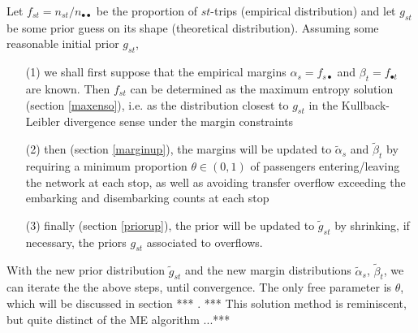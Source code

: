 \documentclass{bmcart}
\begin{document}
Let $f_{st}=n_{st}/n_{\bullet\bullet}$ be the proportion of $st$-trips (empirical distribution) and let $g_{st}$ be some prior guess on its shape (theoretical distribution). 
Assuming some reasonable initial prior $g_{st}$, 
\begin{itemize}
\item[(1)] we shall first suppose that the empirical margins $\alpha_s=f_{s\bullet}$ and $\beta_t=f_{\bullet t}$ are known.  
Then $f_{st}$ can be determined as the maximum entropy solution (section \ref{maxenso}), i.e. as the distribution closest to $g_{st}$ in the Kullback-Leibler divergence sense under the margin constraints
\item[(2)] then (section \ref{marginup}), the margins will be updated to $\tilde{\alpha}_s$ and $\tilde{\beta}_t$   by requiring a minimum proportion $\theta\in (0,1)$ of passengers entering/leaving the network at each stop, as well as avoiding transfer overflow exceeding the embarking and disembarking counts at each stop
 \item[(3)] finally (section \ref{priorup}), the prior will be updated to $\tilde{g}_{st}$ by shrinking, if necessary, the priors $g_{st}$ associated to overflows. 
\end{itemize}
With the new prior distribution $\widetilde{g}_{st}$ and the new margin distributions $\widetilde{\alpha}_s$, $\widetilde{\beta}_t$, we can iterate the 
 the above steps, until convergence. The only free parameter is $\theta$, which will be discussed in section *** . *** This solution method is reminiscent, but quite distinct of the ME algorithm ...***
\end{document}
